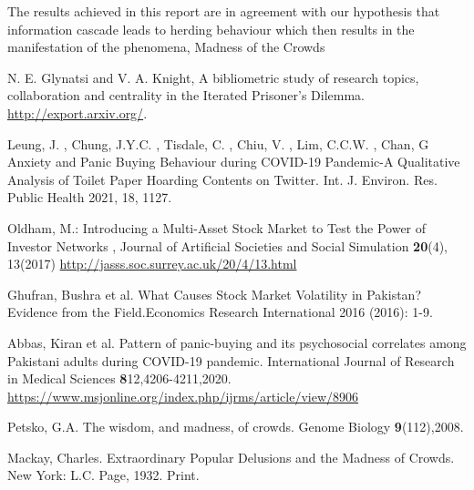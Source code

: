 \documentclass[runningheads]{llncs}
\begin{document}
The results achieved in this report are in agreement with our hypothesis that information cascade leads to herding behaviour which then results in the manifestation of the phenomena, Madness of the Crowds






\newpage


\begin{thebibliography}{8}


N. E. Glynatsi and V. A. Knight, A bibliometric study of research topics, collaboration and centrality in the Iterated Prisoner’s Dilemma. \url{http://export.arxiv.org/}.

 Leung, J. , Chung, J.Y.C. , Tisdale, C. , Chiu, V. , Lim, C.C.W. , Chan, G Anxiety and Panic Buying Behaviour during COVID-19 Pandemic-A Qualitative Analysis of Toilet Paper Hoarding Contents on Twitter. Int. J. Environ. Res. Public Health 2021, 18, 1127. 
 

Oldham, M.: Introducing a Multi-Asset Stock Market to Test the Power of Investor Networks , Journal of Artificial Societies and Social Simulation \textbf{20}(4), 13(2017) \url{http://jasss.soc.surrey.ac.uk/20/4/13.html} 
		
Ghufran, Bushra et al. What Causes Stock Market Volatility in Pakistan? Evidence from the Field.Economics Research International 2016 (2016): 1-9.

Abbas, Kiran et al. Pattern of panic-buying and its psychosocial correlates among Pakistani adults during COVID-19 pandemic. International Journal of Research in Medical Sciences \textbf{8}12,4206-4211,2020. \url{https://www.msjonline.org/index.php/ijrms/article/view/8906} 

Petsko, G.A. The wisdom, and madness, of crowds. Genome Biology  \textbf{9}(112),2008. 

Mackay, Charles. Extraordinary Popular Delusions and the Madness of Crowds. New York: L.C. Page, 1932. Print.



\end{thebibliography}
\newpage
\appendix
\end{document}
